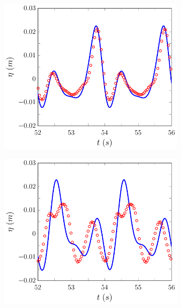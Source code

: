\begin{figure}
	\centering
	\begin{subfigure}{0.5\textwidth}
		\includegraphics[width=\textwidth]{./chp6/figures/Experiment/Beji/sl/FDVMWG5.pdf}
		\vspace{0.5cm}
	\end{subfigure}%
	\begin{subfigure}{0.5\textwidth}
		\includegraphics[width=\textwidth]{./chp6/figures/Experiment/Beji/sl/FDVMWG6.pdf}

\end{subfigure}
\end{figure}
